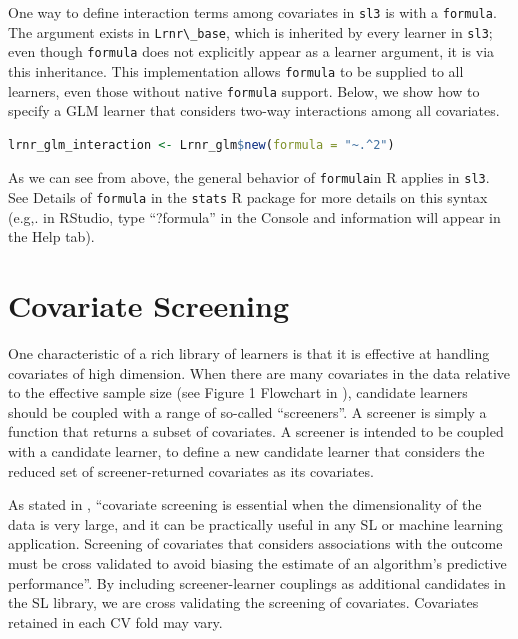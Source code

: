 \documentclass[
  12pt, krantz2,
]{krantz}
\newcommand{\passthrough}[1]{#1}
\newcommand{\1}{\mathbbm{1}}
\theoremstyle{definition}
\theoremstyle{definition}
\theoremstyle{definition}
\theoremstyle{definition}
\theoremstyle{remark}
\begin{document}
One way to define interaction terms among covariates in \passthrough{\lstinline!sl3!} is with a
\passthrough{\lstinline!formula!}. The argument exists in \passthrough{\lstinline!Lrnr\_base!}, which is inherited by every
learner in \passthrough{\lstinline!sl3!}; even though \passthrough{\lstinline!formula!} does not explicitly appear as a
learner argument, it is via this inheritance. This implementation allows
\passthrough{\lstinline!formula!} to be supplied to all learners, even those without native \passthrough{\lstinline!formula!}
support. Below, we show how to specify a GLM learner that considers two-way
interactions among all covariates.

\begin{lstlisting}[language=R]
lrnr_glm_interaction <- Lrnr_glm$new(formula = "~.^2")
\end{lstlisting}

As we can see from above, the general behavior of \passthrough{\lstinline!formula!}in R applies in
\passthrough{\lstinline!sl3!}. See Details of \passthrough{\lstinline!formula!} in the \passthrough{\lstinline!stats!} R package for more details on
this syntax (e.g,. in RStudio, type ``?formula'' in the Console and information
will appear in the Help tab).

\hypertarget{covariate-screening}{%
\section{Covariate Screening}\label{covariate-screening}}

One characteristic of a rich library of learners is that it is effective at
handling covariates of high dimension. When there are many covariates in the
data relative to the effective sample size (see Figure 1 Flowchart in
\citet{rvp2022super}), candidate learners should be coupled with a range of so-called
``screeners''. A screener is simply a function that returns a subset of
covariates. A screener is intended to be coupled with a candidate learner, to
define a new candidate learner that considers the reduced set of
screener-returned covariates as its covariates.

As stated in \citet{rvp2022super}, ``covariate screening is essential when the
dimensionality of the data is very large, and it can be practically useful in
any SL or machine learning application. Screening of covariates that considers
associations with the outcome must be cross validated to avoid biasing the
estimate of an algorithm's predictive performance''. By including
screener-learner couplings as additional candidates in the SL library, we are
cross validating the screening of covariates. Covariates retained in each CV
fold may vary.
\end{document}
